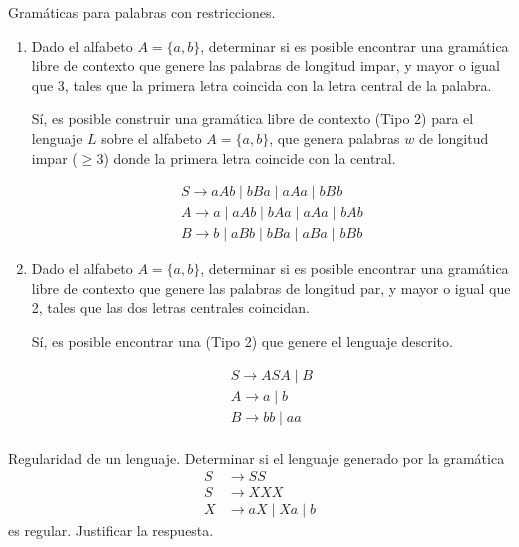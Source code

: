 \documentclass[12pt]{book} %
\begin{document}
\begin{ejercicio}
Gramáticas para palabras con restricciones.

\begin{enumerate}[label=\alph*)]
    \item Dado el alfabeto $A = \{a, b\}$, determinar si es posible encontrar una gramática libre de contexto que genere las palabras de longitud impar, y mayor o igual que 3, tales que la primera letra coincida con la letra central de la palabra.

    \begin{solucion}[a)]
    Sí, es posible construir una gramática libre de contexto (Tipo 2) para el lenguaje \( L \) sobre el alfabeto \( A = \{a, b\} \), que genera palabras \( w \) de longitud impar (\( \geq 3 \)) donde la primera letra coincide con la central. 

    \begin{align*}
    S \rightarrow aAb \mid bBa \mid aAa \mid bBb \\
    A \rightarrow a \mid aAb \mid bAa \mid aAa \mid bAb \\
    B \rightarrow b \mid aBb \mid bBa \mid aBa \mid bBb
    \end{align*}


    \end{solucion}

    \item Dado el alfabeto $A = \{a, b\}$, determinar si es posible encontrar una gramática libre de contexto que genere las palabras de longitud par, y mayor o igual que 2, tales que las dos letras centrales coincidan.

    \begin{solucion}[b)]
    Sí, es posible encontrar una  (Tipo 2) que genere el lenguaje descrito.

    \begin{align*}
    S  \rightarrow ASA \mid B \\
    A \rightarrow a\mid b \\
    B \rightarrow bb \mid aa \\
    \end{align*}


    \end{solucion}


\end{enumerate}

\end{ejercicio}

\begin{ejercicio}
Regularidad de un lenguaje.
Determinar si el lenguaje generado por la gramática  
\begin{align*}
S &\to SS \\
S &\to XXX \\
X &\to aX \mid Xa \mid b
\end{align*}
es regular. Justificar la respuesta.
\end{ejercicio}
\end{document}
